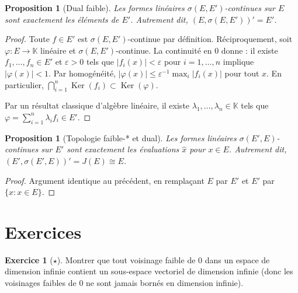\documentclass[a4paper,12pt]{book}
\DeclareMathOperator{\Ker}{Ker}
\newcommand{\K}{\mathbb{K}}
\newcommand{\abs}[1]{\left| #1 \right|}
\theoremstyle{definition}
\newtheorem{exercice}{Exercice}[chapter]
\theoremstyle{plain}
\newtheorem{proposition}[definition]{Proposition}
\theoremstyle{remark}
\begin{document}
\begin{proposition}[Dual faible]
\label{prop:dual-faible}
Les formes linéaires $\sigma(E,E')$-continues sur $E$ sont exactement les éléments
de $E'$. Autrement dit, $(E, \sigma(E,E'))' = E'$.
\end{proposition}

\begin{proof}
Toute $f \in E'$ est $\sigma(E,E')$-continue par définition. Réciproquement, soit
$\varphi : E \to \K$ linéaire et $\sigma(E,E')$-continue. La continuité en $0$
donne : il existe $f_1, \ldots, f_n \in E'$ et $\varepsilon > 0$ tels que
$\abs{f_i(x)} < \varepsilon$ pour $i = 1, \ldots, n$ implique $\abs{\varphi(x)} < 1$.
Par homogénéité, $\abs{\varphi(x)} \le \varepsilon^{-1} \max_i \abs{f_i(x)}$ pour tout $x$.
En particulier, $\bigcap_{i=1}^n \Ker(f_i) \subset \Ker(\varphi)$.

Par un résultat classique d'algèbre linéaire, il existe $\lambda_1, \ldots, \lambda_n \in \K$
tels que $\varphi = \sum_{i=1}^n \lambda_i f_i \in E'$.
\end{proof}

\begin{proposition}[Topologie faible-* et dual]
\label{prop:dual-faible-etoile}
Les formes linéaires $\sigma(E',E)$-continues sur $E'$ sont exactement les
évaluations $\hat{x}$ pour $x \in E$. Autrement dit, $(E', \sigma(E',E))' = J(E) \cong E$.
\end{proposition}

\begin{proof}
Argument identique au précédent, en remplaçant $E$ par $E'$ et $E'$ par $\{\hat{x} : x \in E\}$.
\end{proof}

\section{Exercices}
\label{sec:exo-ch8}

\begin{exercice}[$\star$]
\label{exo:faible-base}
Montrer que tout voisinage faible de $0$ dans un espace de dimension infinie contient
un sous-espace vectoriel de dimension infinie (donc les voisinages faibles de $0$
ne sont jamais bornés en dimension infinie).
\end{exercice}
\end{document}
